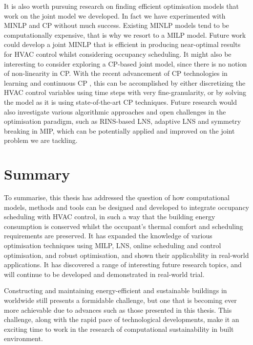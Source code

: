 It is also worth pursuing research on finding efficient optimisation models that work on the joint model we developed. In fact we have experimented with MINLP and CP without much success. Existing MINLP models tend to be computationally expensive, that is why we resort to a MILP model. Future work could develop a joint MINLP that is efficient in producing near-optimal results for HVAC control whilst considering occupancy scheduling. It might also be interesting to consider exploring a CP-based joint model, since there is no notion of non-linearity in CP. With the recent advancement of CP technologies in learning \citep{chu2011improving,schutt2011improving} and continuous CP \citep{feydy2016interval}, this can be accomplished by either discretizing the HVAC control variables using time steps with very fine-granularity, or by solving the model as it is using state-of-the-art CP techniques. Future research would also investigate various algorithmic approaches and open challenges in the optimisation paradigm, such as RINS-based LNS, adaptive LNS and symmetry breaking in MIP, which can be potentially applied and improved on the joint problem we are tackling.
%

\section{Summary}

To summarise, this thesis has addressed the question of how computational models, methods and tools can be designed and developed to integrate occupancy scheduling with HVAC control, in such a way that the building energy consumption is conserved whilst the occupant's thermal comfort and scheduling requirements are preserved. It has expanded the knowledge of various optimisation techniques using MILP, LNS, online scheduling and control optimisation, and robust optimisation, and shown their applicability in real-world applications. It has discovered a range of interesting future research topics, and will continue to be developed and demonstrated in real-world trial.

Constructing and maintaining energy-efficient and sustainable buildings in worldwide still presents a formidable challenge, but one that is becoming ever more achievable due to advances such as those presented in this thesis. This challenge, along with the rapid pace of technological developments, make it an exciting time to work in the research of computational sustainability in built environment.












